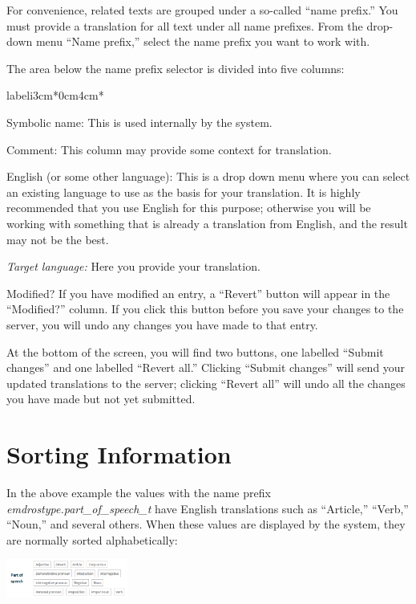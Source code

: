 \documentclass[11pt,oneside,a4paper]{memoir}
\begin{document}
For convenience, related texts are grouped under a so-called ``name prefix.'' You must provide a
translation for all text under all name prefixes. From the drop-down menu ``Name prefix,'' select
the name prefix you want to work with.

The area below the name prefix selector is divided into five columns:


\begin{flexlabelled}{labeli}{3cm}{*}{0cm}{4cm}{*}
\item[Symbolic name:\hfill] This is used internally by the system.
\item[Comment:] This column may provide some context for translation.
\item[English (or some other language):] This is a drop down menu where you can select an existing
  language to use as the basis for your translation. It is highly recommended that you use English
  for this purpose; otherwise you will be working with something that is already a translation
  from English, and the result may not be the best.
\item[\emph{Target language:}\hfill]  Here you provide your translation.
\item[Modified?] If you have modified an entry, a ``Revert'' button will appear in the ``Modified?''
  column. If you click this button before you save your changes to the server, you will undo any
  changes you have made to that entry.
\end{flexlabelled}

At the bottom of the screen, you will find two buttons, one labelled ``Submit changes'' and one
labelled ``Revert all.'' Clicking ``Submit changes'' will send your updated translations to the server;
clicking ``Revert all'' will undo all the changes you have made but not yet submitted.


\section{Sorting Information}

In the above example the values with the name prefix \emph{emdrostype.part\_of\_speech\_t} have
English translations such as ``Article,'' ``Verb,'' ``Noun,'' and several others. When these values
are displayed by the system, they are normally sorted alphabetically:

\begin{center}
  \includegraphics[width=0.3\textwidth]{psp.png}
\end{center}
\end{document}
